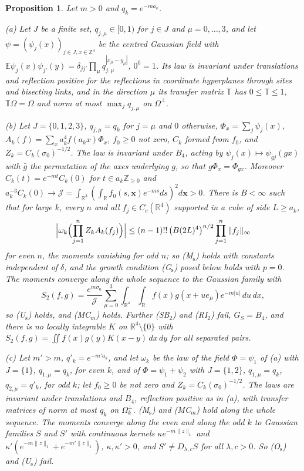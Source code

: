 \documentclass[aps,prd,twocolumn,superscriptaddress,nofootinbib,longbibliography,floatfix,amsmath,amssymb,10pt]{revtex4-2}
\newtheorem{proposition}[theorem]{Proposition}
\theoremstyle{definition}
\theoremstyle{remark}
\newcommand{\R}{\mathbb{R}}
\newcommand{\Z}{\mathbb{Z}}
\newcommand{\E}{\mathbb{E}}
\begin{document}
\begin{proposition}\label{prop:limitEgauss}
Let $m>0$ and $q_k=e^{-ma_k}$.

\textup{(a)} Let $J$ be a finite set, $q_{j,\mu}\in[0,1)$ for $j\in J$ and
$\mu=0,\dots,3$, and let $\psi=(\psi_j(x))_{j\in J,x\in\Z^4}$ be the centred
Gaussian field with $\E\psi_j(x)\psi_{j'}(y)=\delta_{jj'}\prod_\mu
q_{j,\mu}^{|x_\mu-y_\mu|}$, $0^0=1$. Its law is invariant under translations
and reflection positive for the reflections in coordinate hyperplanes
through sites and bisecting links, and in the direction $\mu$ its transfer
matrix $\mathbb T$ has $0\le\mathbb T\le1$, $\mathbb T\Omega=\Omega$ and norm
at most $\max_jq_{j,\mu}$ on $\Omega^\perp$.

\textup{(b)} Let $J=\{0,1,2,3\}$, $q_{j,\mu}=q_k$ for $j=\mu$ and $0$
otherwise, $\Phi_x=\sum_j\psi_j(x)$, $A_k(f)=\sum_xa_k^4f(a_kx)\Phi_x$,
$f_0\ge0$ not zero, $C_k$ formed from $f_0$, and $Z_k=C_k(\sigma_0)^{-1/2}$.
The law is invariant under $B_4$, acting by $\psi_j(x)\mapsto\psi_{\bar gj}
(gx)$ with $\bar g$ the permutation of the axes underlying $g$, so that
$g\Phi_x=\Phi_{gx}$. Moreover $C_k(t)=e^{-mt}C_k(0)$ for $t\in a_k\Z_{\ge0}$
and $a_k^{-3}C_k(0)\to\mathcal J=\int_{\R^3}(\int_\R f_0(s,\mathbf x)
e^{-ms}ds)^2d\mathbf x>0$. There is $B<\infty$ such that for large $k$,
every $n$ and all $f_j\in C_c(\R^4)$ supported in a cube of side $L\ge a_k$,
\[
\Bigl|\omega_k\Bigl(\prod_{j=1}^nZ_kA_k(f_j)\Bigr)\Bigr|\le(n-1)!!\,
\bigl(B(2L)^4\bigr)^{n/2}\prod_{j=1}^n\|f_j\|_\infty
\]
for even $n$, the moments vanishing for odd $n$; so \textup{(M$_{\mathrm
s}$)} holds with constants independent of $\delta$, and the growth
condition \textup{(G$_{\mathrm s}$)} posed below holds with $p=0$. The
moments converge along the whole sequence to the Gaussian family with
\[
S_2(f,g)=\frac{e^{m\sigma_0}}{\mathcal J}\sum_{\mu=0}^3\int_{\R^4}\int_\R
f(x)g(x+ue_\mu)e^{-m|u|}\,du\,dx ,
\]
so \textup{(U$_{\mathrm s}$)} holds, and \textup{(MC$_m$)} holds. Further
\textup{(SB$_2$)} and \textup{(RI$_2$)} fail, $G_S=B_4$, and there is no
locally integrable $K$ on $\R^4\setminus\{0\}$ with $S_2(f,g)=\iint f(x)g(y)
K(x-y)\,dx\,dy$ for all separated pairs.

\textup{(c)} Let $m'>m$, $q'_k=e^{-m'a_k}$, and let $\omega_k$ be the law of
the field $\Phi=\psi_1$ of \textup{(a)} with $J=\{1\}$, $q_{1,\mu}=q_k$, for
even $k$, and of $\Phi=\psi_1+\psi_2$ with $J=\{1,2\}$, $q_{1,\mu}=q_k$,
$q_{2,\mu}=q'_k$, for odd $k$; let $f_0\ge0$ be not zero and $Z_k=C_k(
\sigma_0)^{-1/2}$. The laws are invariant under translations and $B_4$,
reflection positive as in \textup{(a)}, with transfer matrices of norm at
most $q_k$ on $\Omega_k^\perp$. \textup{(M$_{\mathrm s}$)} and
\textup{(MC$_m$)} hold along the whole sequence. The moments converge along
the even and along the odd $k$ to Gaussian families $S$ and $S'$ with
continuous kernels $\kappa e^{-m\|z\|_1}$ and $\kappa'(e^{-m\|z\|_1}+
e^{-m'\|z\|_1})$, $\kappa,\kappa'>0$, and $S'\ne D_{\lambda,c}S$ for all
$\lambda,c>0$. So \textup{(O$_{\mathrm s}$)} and \textup{(U$_{\mathrm s}$)}
fail.
\end{proposition}
\end{document}
